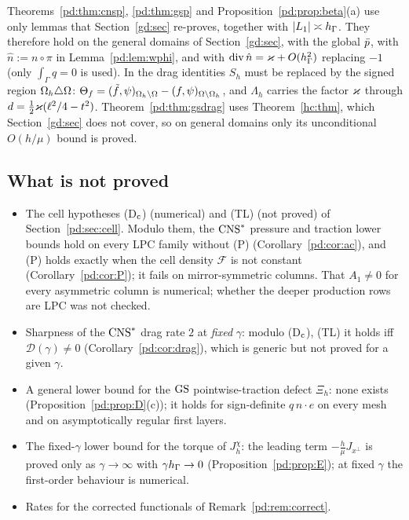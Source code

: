 \begin{remark}\label{pd:rem:gd}
Theorems~\ref{pd:thm:cnsp}, \ref{pd:thm:gsp} and Proposition~\ref{pd:prop:beta}(a) use only lemmas that Section~\ref{gd:sec} re-proves, together with $|L_1|\asymp h_\Gamma$. They therefore hold on the general domains of Section~\ref{gd:sec}, with the global $\bar p$, with $\hat n:=n\circ\pi$ in Lemma~\ref{pd:lem:wphi}, and with $\operatorname{div}\hat n=\varkappa+O(h_\Gamma^2)$ replacing $-1$ (only $\int_\Gamma q=0$ is used). In the drag identities $S_h$ must be replaced by the signed region $\Omega_h\triangle\Omega$: $\Theta_f=(\tilde f,\psi)_{\Omega_h\setminus\Omega}-(f,\psi)_{\Omega\setminus\Omega_h}$, and $\Lambda_h$ carries the factor $\varkappa$ through $d=\frac12\varkappa(\ell^2/4-t^2)$. Theorem~\ref{pd:thm:gsdrag} uses Theorem~\ref{hc:thm}, which Section~\ref{gd:sec} does not cover, so on general domains only its unconditional $O(h/\mu)$ bound is proved.
\end{remark}

\subsection{What is not proved}\label{pd:sec:notproved}
\begin{itemize}
\item The cell hypotheses (D$_{\rm c}$) (numerical) and (TL) (not proved) of Section~\ref{pd:sec:cell}. Modulo them, the $\mathrm{CNS}^\ast$ pressure and traction lower bounds hold on every LPC family without (P) (Corollary~\ref{pd:cor:ac}), and (P) holds exactly when the cell density $\mathcal F$ is not constant (Corollary~\ref{pd:cor:P}); it fails on mirror-symmetric columns. That $A_1\ne0$ for every asymmetric column is numerical; whether the deeper production rows are LPC was not checked.
\item Sharpness of the $\mathrm{CNS}^\ast$ drag rate $2$ at \emph{fixed} $\gamma$: modulo (D$_{\rm c}$), (TL) it holds iff $\mathcal D(\gamma)\ne0$ (Corollary~\ref{pd:cor:drag}), which is generic but not proved for a given $\gamma$.
\item A general lower bound for the $\mathrm{GS}$ pointwise-traction defect $\Xi_h$: none exists (Proposition~\ref{pd:prop:D}(c)); it holds for sign-definite $q\,n\cdot e$ on every mesh and on asymptotically regular first layers.
\item The fixed-$\gamma$ lower bound for the torque of $J^\chi_h$: the leading term $-\frac h\mu J_{x^\perp}$ is proved only as $\gamma\to\infty$ with $\gamma h_\Gamma\to0$ (Proposition~\ref{pd:prop:E}); at fixed $\gamma$ the first-order behaviour is numerical.
\item Rates for the corrected functionals of Remark~\ref{pd:rem:correct}.
\end{itemize}
